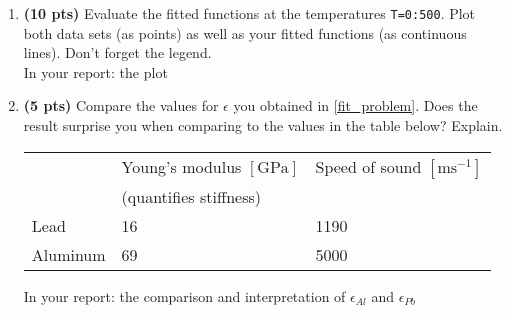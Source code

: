 \documentclass[11pt]{article}
\begin{document}
\begin{enumerate}[resume]
\item \textbf{(10 pts)} Evaluate the fitted functions at the temperatures \verb|T=0:500|. Plot both data sets (as points) as well as your fitted functions (as continuous lines). Don't forget the legend.\\
In your report: the plot

\item \textbf{(5 pts)} Compare the values for $\epsilon$ you obtained in \ref{fit_problem}. Does the result surprise you when comparing to the values in the table below? Explain.

\begin{tabular}[]{lll}
		&	Young's modulus $\mathrm{[GPa]}$	&	Speed of sound $\mathrm{[ms^{-1}]}$	\\	
		&	(quantifies stiffness)				&									\\
Lead		& 	16							&	1190								\\
Aluminum	& 	69							&	5000								\\
\end{tabular}

In your report: the comparison and interpretation of $\epsilon_{Al}$ and $\epsilon_{Pb}$

\end{enumerate}
\end{document}
